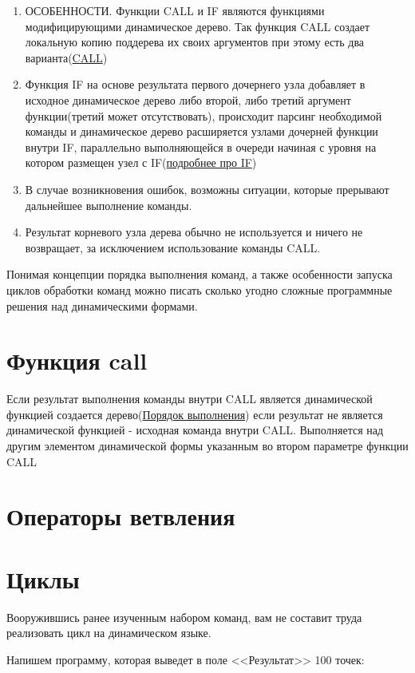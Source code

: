 \documentclass[../index.tex]{subfiles}
\begin{document}
\begin{enumerate}
    \item ОСОБЕННОСТИ. Функции CALL и IF являются функциями модифицирующими динамическое дерево. Так функция CALL создает локальную копию поддерева их своих аргументов при этому есть два варианта(\hyperref[sec:fcall]{CALL})
    \item Функция IF на основе результата первого дочернего узла добавляет в исходное динамическое дерево либо второй, либо третий аргумент функции(третий может отсутствовать), происходит парсинг необходимой команды и динамическое дерево расширяется узлами дочерней функции внутри IF, параллельно выполняющейся в очереди начиная с уровня на котором размещен узел с IF(\hyperref[sec:fif]{подробнее про IF})
    \item В случае возникновения ошибок, возможны ситуации, которые прерывают дальнейшее выполнение команды.
    \item Результат корневого узла дерева обычно не используется и ничего не возвращает, за исключением  использование команды CALL.
\end{enumerate}

Понимая концепции порядка выполнения команд, а также особенности запуска циклов обработки команд можно писать сколько угодно сложные программные решения над динамическими формами.

\section{Функция call}\label{sec:fcall}
    Если результат выполнения команды внутри CALL является динамической функцией создается дерево(\hyperref[sec:execrules]{Порядок выполнения}) если результат не является динамической функцией - исходная команда внутри CALL. Выполняется над другим элементом динамической формы указанным во втором параметре функции CALL

\section{Операторы ветвления}\label{sec:fif}

\section{Циклы}\label{sec:loops}

    Вооружившись ранее изученным набором команд, вам не составит труда реализовать цикл на динамическом языке.
    
    Напишем программу, которая выведет в поле <<Результат>> 100 точек:
    
\end{document}
